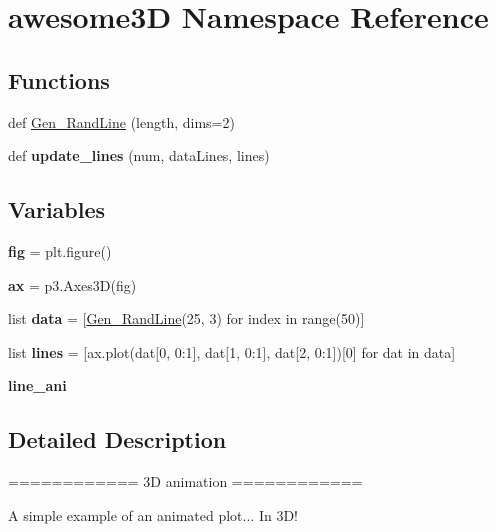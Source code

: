 \hypertarget{namespaceawesome3_d}{}\section{awesome3D Namespace Reference}
\label{namespaceawesome3_d}
\subsection*{Functions}
\begin{DoxyCompactItemize}
\item 
def \mbox{\hyperlink{namespaceawesome3_d_a8dbde731a58e2a410a00a8b710f675dd}{Gen\+\_\+\+Rand\+Line}} (length, dims=2)
\item 
\mbox{\label{namespaceawesome3_d_a3880bce8144e84df6f930e519f8aaf4b}} 
def {\bfseries update\+\_\+lines} (num, data\+Lines, lines)
\end{DoxyCompactItemize}
\subsection*{Variables}
\begin{DoxyCompactItemize}
\item 
\mbox{\label{namespaceawesome3_d_a1d67360c21020aa16682a83c2728f039}} 
{\bfseries fig} = plt.\+figure()
\item 
\mbox{\label{namespaceawesome3_d_a1924ab2ef7c8b99f6dbaa5abe2fb6f7b}} 
{\bfseries ax} = p3.\+Axes3D(fig)
\item 
\mbox{\label{namespaceawesome3_d_a4b315f767d2e877640adbe6f9b4e2a67}} 
list {\bfseries data} = \mbox{[}\mbox{\hyperlink{namespaceawesome3_d_a8dbde731a58e2a410a00a8b710f675dd}{Gen\+\_\+\+Rand\+Line}}(25, 3) for index in range(50)\mbox{]}
\item 
\mbox{\label{namespaceawesome3_d_a6eb83efe0d9acac5432efdb18bba939d}} 
list {\bfseries lines} = \mbox{[}ax.\+plot(dat\mbox{[}0, 0\+:1\mbox{]}, dat\mbox{[}1, 0\+:1\mbox{]}, dat\mbox{[}2, 0\+:1\mbox{]})\mbox{[}0\mbox{]} for dat in data\mbox{]}
\item 
{\bfseries line\+\_\+ani}
\end{DoxyCompactItemize}


\subsection{Detailed Description}
\begin{DoxyVerb}============
3D animation
============

A simple example of an animated plot... In 3D!
\end{DoxyVerb}
 

